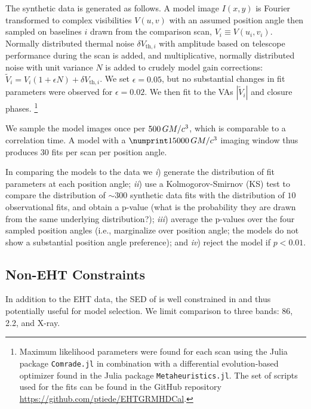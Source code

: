 The synthetic data is generated as follows.
A model image $I(x,y)$ is Fourier transformed to complex visibilities $V(u,v)$ with an assumed position angle then sampled on baselines $i$ drawn from the comparison scan, $V_i \equiv V(u_i,v_i)$.
Normally distributed thermal noise $\delta V_{\mathrm{th},i}$ with amplitude based on telescope performance during the scan is added, and multiplicative, normally distributed noise with unit variance $N$ is added to crudely model gain corrections: $\tilde{V}_i = V_i (1 + \epsilon N) + \delta V_{\mathrm{th},i}$.
We set $\epsilon = 0.05$, but no substantial changes in fit parameters were observed for $\epsilon = 0.02$.
We then fit to the VAs $|\tilde{V}_i|$ and closure phases.
\footnote{Maximum likelihood \mring parameters were found for each scan using the Julia package \texttt{Comrade.jl} \citep{comrade} in combination with a differential evolution-based optimizer
found in the Julia package \texttt{Metaheuristics.jl}.  The set of scripts used for the fits can be found in the GitHub repository \url{https://github.com/ptiede/EHTGRMHDCal}.}

We sample the model images once per $500\,GM/c^3$, which is comparable to a correlation time.
A model with a $\no{15000}\,\tg$ imaging window thus produces $30$ fits per scan per position angle.

In comparing the models to the data we
\emph{i}) generate the distribution of fit parameters at each position angle;
\emph{ii}) use a Kolmogorov-Smirnov (KS) test to compare the distribution of $\sim 300$ synthetic data fits with the distribution of $10$ observational fits, and obtain a p-value (what is the probability they are drawn from the same underlying distribution?);
\emph{iii}) average the p-values over the four sampled position angles (i.e., marginalize over position angle; the models do not show a substantial position angle preference); and
\emph{iv}) reject the model if $p < 0.01$.

\subsection{Non-EHT Constraints}

In addition to the EHT data, the SED of \sgra is well constrained in  and thus potentially useful for model selection.
We limit comparison to three bands: 86\GHz, 2.2\um, and X-ray.

